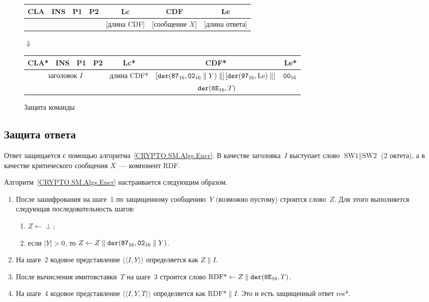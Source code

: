 \begin{figure}[!h]
\begin{center}
\begin{tabular}{|c|c|c|c|c|c|c|}
\hline
CLA & INS & P1 & P2 & Lc & CDF & Le \\
\hline
\hline
\multicolumn{4}{|c|}{} & [длина CDF] & [сообщение $X$] & [длина ответа]\\
\hline
\end{tabular}

\vskip3pt$\Downarrow$\vskip3pt

\begin{tabular}{|c|c|c|c|c|c|c|}
\hline
CLA* & INS & P1 & P2 & Lc* & CDF* & Le*\\
\hline
\hline
\multicolumn{4}{|c|}{заголовок $I$} & длина CDF* & 
$\left[\texttt{der}(\texttt{87}_{16},\texttt{02}_{16}\parallel Y)\parallel\right]
\left[\texttt{der}(\texttt{97}_{16},\text{Le})\parallel\right]$ & $\texttt{00}_{16}$\\
\multicolumn{4}{|c|}{} & & 
$\phantom{[}\texttt{der}(\texttt{8E}_{16},T)$\hfill\mbox{} &\\
\hline
\end{tabular}
\end{center}
\caption{Защита команды}\label{Fig.CMDS.CmdEncr}
\end{figure}

\subsection{Защита ответа}\label{CMDS.SM.EncrRez}

Ответ защищается с помощью алгоритма~\ref{CRYPTO.SM.Algs.Encr}. 
В качестве заголовка~$I$ выступает слово $\text{SW1} \parallel\text{SW2}$ 
(2 октета), а в качестве критического сообщения $X$~--- компонент RDF. 

Алгоритм~\ref{CRYPTO.SM.Algs.Encr} настраивается следующим образом.
\begin{enumerate}
\item
После зашифрования на шаге~1 по защищенному сообщению~$Y$
(возможно пустому) строится слово~$Z$. Для этого выполняется следующая 
последовательность шагов:
\begin{enumerate}
\item
$Z\gets\perp$;
\item
если $|Y|>0$, то $Z\gets Z\parallel\texttt{der}(\texttt{87}_{16},\texttt{02}_{16}\parallel Y)$.
\end{enumerate}
\item
На шаге~2 кодовое представление $\langle\langle I,Y\rangle\rangle$
определяется как $Z\parallel I$.
\item
После вычисления имитовставки~$T$ на шаге~3 строится слово
$\text{RDF*}\gets Z\parallel \texttt{der}(\texttt{8E}_{16}, T)$.
\item
На шаге~4 кодовое представление $\langle\langle I,Y,T\rangle\rangle$
определяется как $\text{RDF*}\parallel I$.
Это и есть защищенный ответ res*.
\end{enumerate}

